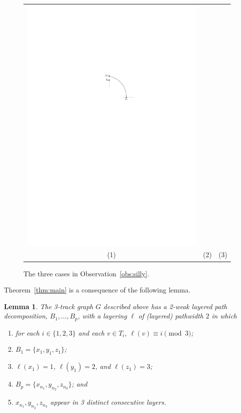 \documentclass{jgaa-art}
\newcommand{\figlabel}[1]{\label{fig:#1}}
\newcommand{\thmref}[1]{Theorem~\ref{thm:#1}}
\newtheorem{lem}{Lemma}{\bfseries}{\itshape}
\newcommand{\lemlabel}[1]{\label{lem:#1}}
\newcommand{\obsref}[1]{Observation~\ref{obs:#1}}
\begin{document}
\begin{figure}
\begin{center}
\begin{tabular}{ccc}
       \includegraphics{figs/silly-3} \\
       (1) & (2) & (3)
     \end{tabular}
   \end{center}
   \caption{The three cases in \obsref{silly}.}
   \figlabel{3-cases}
\end{figure}


\thmref{main} is a consequence of the following lemma.

\begin{lem}\lemlabel{main}
  The %
  3-track graph $G$
  described above has a 2-weak layered path
  decomposition, $B_1,\ldots,B_p$, with a layering $\ell$ of (layered) pathwidth $2$ in which
  \begin{enumerate}
    \item for each $i\in\{1,2,3\}$ and each $v\in T_i$,
      $\ell(v)\equiv i\pmod 3$;
    \item $B_1=\{x_1,y_1,z_1\}$;
    \item $\ell(x_1)=1$, $\ell(y_1)=2$, and $\ell(z_1)=3$;
    \item $B_p=\{x_{n_1},y_{n_2},z_{n_3}\}$; and
    \item $x_{n_1},y_{n_2},z_{n_3}$ appear in 3 distinct consecutive layers.
  \end{enumerate}
\end{lem}
\end{document}
